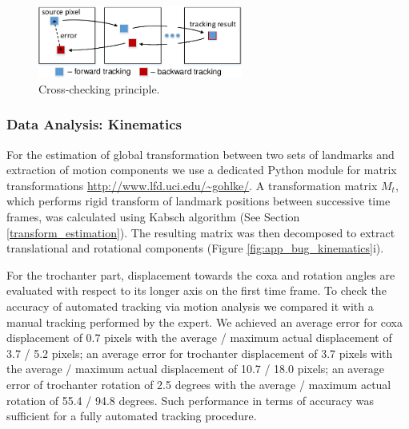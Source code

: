 \begin{figure}[ht]
  \centerline{
    \includegraphics[width=0.6\textwidth]{figures/fig_620_p185.pdf} 
  }  
  \caption{Cross-checking principle.}
  \label{fig:app_bug_cross_checking}
\end{figure}


\subsubsection{Data Analysis: Kinematics}
\label{bug_kinematics}

For the estimation of global transformation between two sets of landmarks and
extraction of motion components we use a dedicated Python module for matrix transformations \url{http://www.lfd.uci.edu/~gohlke/}.  A transformation matrix $M_t$, which performs rigid transform of landmark positions between successive time frames, was calculated using Kabsch algorithm \cite{Kabsch76} (See Section \ref{transform_estimation}). The resulting
matrix was then decomposed to extract translational and rotational components (Figure \ref{fig:app_bug_kinematics}i). 

For the trochanter part, displacement towards the coxa and rotation angles are evaluated with respect to its longer axis on the first time frame.
To check the accuracy of automated tracking via motion analysis we compared it with a manual tracking performed by the expert.  We achieved an average error for coxa displacement of 0.7 pixels with the average
/ maximum actual displacement of 3.7 / 5.2 pixels; an average error for trochanter displacement of
3.7 pixels with the average / maximum actual displacement of 10.7 / 18.0 pixels; an average error of
trochanter rotation of 2.5 degrees with the average / maximum actual rotation of 55.4 / 94.8 degrees. Such performance in terms of accuracy was sufficient for a fully automated tracking procedure.


